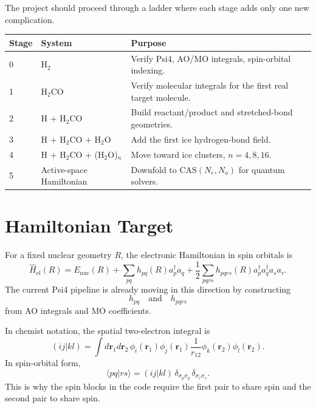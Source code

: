 \documentclass[11pt]{article}
\begin{document}
The project should proceed through a ladder where each stage adds only one new complication.

\begin{center}
\begin{tabular}{lll}
\toprule
Stage & System & Purpose \\
\midrule
0 & H$_2$ & Verify Psi4, AO/MO integrals, spin-orbital indexing. \\
1 & H$_2$CO & Verify molecular integrals for the first real target molecule. \\
2 & H + H$_2$CO & Build reactant/product and stretched-bond geometries. \\
3 & H + H$_2$CO + H$_2$O & Add the first ice hydrogen-bond field. \\
4 & H + H$_2$CO + (H$_2$O)$_n$ & Move toward ice clusters, $n=4,8,16$. \\
5 & Active-space Hamiltonian & Downfold to CAS$(N_e,N_o)$ for quantum solvers. \\
\bottomrule
\end{tabular}
\end{center}

\section{Hamiltonian Target}

For a fixed nuclear geometry $R$, the electronic Hamiltonian in spin orbitals is
\begin{equation}
  \hat{H}_{\mathrm{el}}(R)
  =
  E_{\mathrm{nuc}}(R)
  +
  \sum_{pq} h_{pq}(R) a_p^\dagger a_q
  +
  \frac{1}{2}\sum_{pqrs} h_{pqrs}(R)
  a_p^\dagger a_q^\dagger a_s a_r .
\end{equation}
The current Psi4 pipeline is already moving in this direction by constructing
\begin{equation}
  h_{pq}
  \quad \mathrm{and} \quad
  h_{pqrs}
\end{equation}
from AO integrals and MO coefficients.

In chemist notation, the spatial two-electron integral is
\begin{equation}
  (ij|kl)
  =
  \int d\mathbf{r}_1 d\mathbf{r}_2\,
  \phi_i(\mathbf{r}_1)\phi_j(\mathbf{r}_1)
  \frac{1}{r_{12}}
  \phi_k(\mathbf{r}_2)\phi_l(\mathbf{r}_2).
\end{equation}
In spin-orbital form,
\begin{equation}
  \langle pq|rs\rangle
  =
  (ij|kl)\,
  \delta_{\sigma_p\sigma_q}\,
  \delta_{\sigma_r\sigma_s}.
\end{equation}
This is why the spin blocks in the code require the first pair to share spin and the second pair to share spin.
\end{document}
